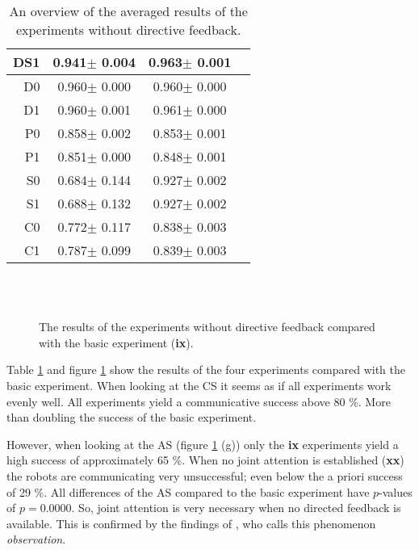 \begin{table}
\begin{tabular}{||r|c|c|c||}
DS1&	0.941$\pm$	0.004&	0.963$\pm$	0.001&	\\\hline
D0&	0.960$\pm$	0.000&	0.960$\pm$	0.000&	\\\hline
D1&	0.960$\pm$	0.001&	0.961$\pm$	0.000&	\\\hline
P0&	0.858$\pm$	0.002&	0.853$\pm$	0.001&	\\\hline
P1&	0.851$\pm$	0.000&	0.848$\pm$	0.001&	\\\hline
S0&	0.684$\pm$	0.144&	0.927$\pm$	0.002&	\\\hline
S1&	0.688$\pm$	0.132&	0.927$\pm$	0.002&	\\\hline
C0&	0.772$\pm$	0.117&	0.838$\pm$	0.003&	\\\hline
C1&	0.787$\pm$	0.099&	0.839$\pm$	0.003&	\\\hline
\hline
\end{tabular}
\caption{An overview of the averaged results of the experiments without directive feedback.}
\label{t:feed:oli}
\end{table}

\begin{figure}
\centering
{}
\\
\\
\end{figure}
\begin{figure}[t]
\centering
{}
\caption{The results of the experiments without directive feedback compared with the basic experiment ({\bf ix}).}
\label{f:feed:oli}
\end{figure}

Table \ref{t:feed:oli} and figure \ref{f:feed:oli} show the results of the four experiments compared with the basic experiment. When looking at the CS it seems as if all experiments work evenly well. All experiments yield a communicative success above 80 \%. More than doubling the success of the basic experiment.

However, when looking at the AS (figure \ref{f:feed:oli} (g)) only the {\bf ix} experiments yield a high success of approximately 65 \%. When no joint attention is established ({\bf xx}) the robots are communicating very unsuccessful; even below the a priori success of 29 \%. All differences of the AS compared to the basic experiment have $p$-values of $p=0.0000$. So, joint attention is very necessary when no directed feedback is available. This is confirmed by the findings of , who calls this phenomenon {\em observation}.

